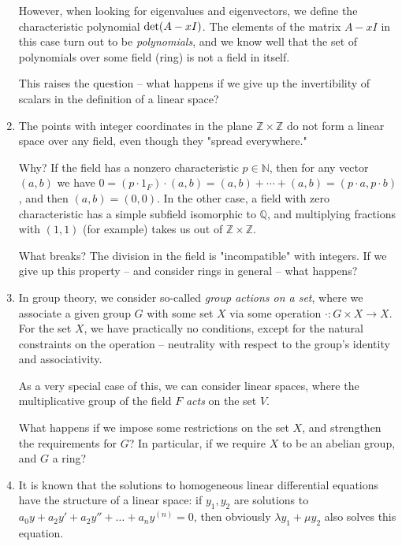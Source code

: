 \documentclass{article}
\newif\ifusemulticols
\theoremstyle{definition}
\theoremstyle{remark}
\theoremstyle{plain}
\theoremstyle{plain}
\newenvironment{mymulticols}
    { \ifusemulticols \begin{multicols}{2} \fi }
    { \ifusemulticols \end{multicols} \fi }
\newcommand{\N}{\mathbb{N}}
\newcommand{\Z}{\mathbb{Z}}
\begin{document}
\begin{mymulticols}
\begin{enumerate}
        However, when looking for eigenvalues and eigenvectors, we define the characteristic
        polynomial $\textnormal{det}(A - xI)$. The elements of the matrix $A-xI$ in this case turn
        out to be \textit{polynomials}, and we know well that the set of polynomials over some field
        (ring) is not a field in itself.

        This raises the question -- what happens if we give up the invertibility of scalars in the
        definition of a linear space?

    \item The points with integer coordinates in the plane $\Z \times \Z$ do not form a linear space
      over any field, even though they "spread everywhere."

        Why? If the field has a nonzero characteristic $p \in \N$, then for any vector $(a, b)$ we
        have $0 = (p \cdot 1_F) \cdot (a, b) = (a, b) + \cdots + (a, b) = (p \cdot a, p \cdot b)$,
        and then $(a, b) = (0, 0)$. In the other case, a field with zero characteristic has a simple
        subfield isomorphic to $\mathbb{Q}$, and multiplying fractions with $(1,1)$ (for example)
        takes us out of $\Z \times \Z$.

        What breaks? The division in the field is "incompatible" with integers.
        If we give up this property -- and consider rings in general -- what happens?

    \item In group theory, we consider so-called \textit{group actions on a set}, where we associate
        a given group $G$ with some set $X$ via some operation $\cdot : G \times X \to X$. For the set
        $X$, we have practically no conditions, except for the natural constraints on the operation --
        neutrality with respect to the group's identity and associativity.

        As a very special case of this, we can consider linear spaces, where the multiplicative
        group of the field $F$ \textit{acts} on the set $V$.

        What happens if we impose some restrictions on the set $X$, and strengthen the requirements
        for $G$? In particular, if we require $X$ to be an abelian group, and $G$ a ring?

    \item It is known that the solutions to homogeneous linear differential equations have the
        structure of a linear space: if $y_1, y_2$ are solutions to $a_0y + a_2y' + a_2y'' + \ldots +
        a_n y^{(n)} = 0$, then obviously $ \lambda y_1 + \mu y_2$ also solves this equation.


\end{enumerate}
\end{mymulticols}
\end{document}
